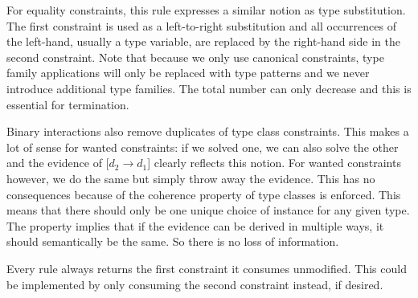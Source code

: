 For equality constraints, this rule expresses a similar notion as type
substitution. The first constraint is used as a left-to-right substitution and
all occurrences of the left-hand, usually a type variable, are replaced by the
right-hand side in the second constraint. Note that because we only use
canonical constraints, type family applications will only be replaced with type
patterns and we never introduce additional type families. The total number can
only decrease and this is essential for termination.

Binary interactions also remove duplicates of type class constraints. This
makes a lot of sense for wanted constraints: if we solved one, we can also solve
the other and the evidence of $[d_2 \rightarrow d_1$] clearly reflects this
notion. For wanted constraints however, we do the same but simply throw away the
evidence. This has no consequences because of the coherence property of type
classes is enforced. This means that there should only be one unique choice of
instance for any given type. The property implies that if the evidence can be
derived in multiple ways, it should semantically be the same. So there is no
loss of information.

Every rule always returns the first constraint it consumes unmodified. This
could be implemented by only consuming the second constraint instead, if desired.

